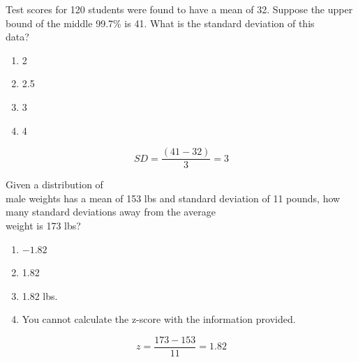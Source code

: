 \documentclass[11pt, chapterprefix=true]{scrbook}\usepackage[]{graphicx}\usepackage[]{color}
\begin{document}
\begin{exercises}
\begin{exercise}
    Test scores for 120 students were found to have a mean of 32.  Suppose the upper bound of the middle 99.7\% is  41.  What is the standard deviation of this \\ data?
    
	  \begin{enumerate}
	  \item 2
	  \item 2.5
	  \item 3
	  \item 4
	  \end{enumerate}
	  
    
	\end{exercise}
	\begin{solution}   %
	
	  \begin{equation}
	    SD = \frac{(41 - 32)}{3} = 3
	  \end{equation}
	  
	\end{solution}

  \begin{exercise} %

    Given a distribution of \\ male weights  has a mean of 153 lbs and standard deviation of 11 pounds, how many standard deviations away from the average \\ weight is 173 lbs?

	  \begin{enumerate}
	  \item $-1.82$
	  \item 1.82
	  \item 1.82 lbs.
	  \item You cannot calculate the z-score with the information provided.
	  \end{enumerate}

    
	\end{exercise}
	\begin{solution}   %
	
	  \begin{equation*}
	    z = \frac{173 - 153}{11} = 1.82
	  \end{equation*}
	  
	\end{solution}

  \begin{exercise} %


\end{exercise}
\end{exercises}
\end{document}
